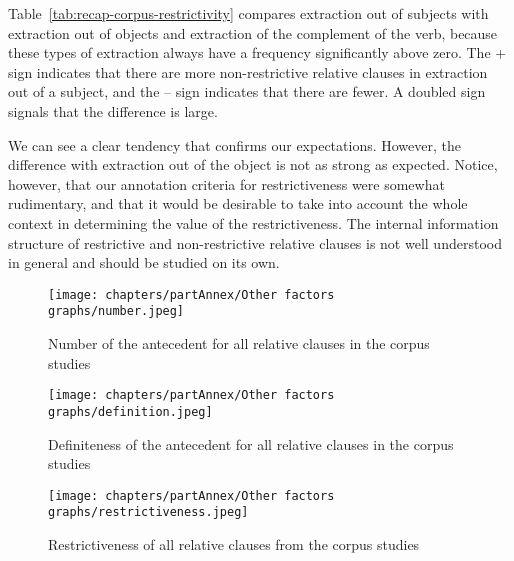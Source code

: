 Table~\ref{tab:recap-corpus-restrictivity} compares extraction out of subjects with extraction out of objects and extraction of the complement of the verb, because these types of extraction always have a frequency significantly above zero. The + sign indicates that there are more non-restrictive relative clauses in extraction out of a subject, and the -- sign indicates that there are fewer. A doubled sign signals that the difference is large. 

We can see a clear tendency that confirms our expectations. However, the difference with extraction out of the object is not as strong as expected. Notice, however, that our annotation criteria for restrictiveness were somewhat rudimentary, and that it would be desirable to take into account the whole context in determining the value of the restrictiveness. The internal information structure of restrictive and non-restrictive relative clauses is not well understood in general and should be studied on its own.

\begin{figure}
        \centering
        \texttt{[image: chapters/partAnnex/Other factors graphs/number.jpeg]}
        \caption{Number of the antecedent for all relative clauses in the corpus studies}
        \label{fig:number-corpus}
\end{figure}

\begin{figure}
        \centering
        \texttt{[image: chapters/partAnnex/Other factors graphs/definition.jpeg]}
        \caption{Definiteness of the antecedent for all relative clauses in the corpus studies}
        \label{fig:definiteness-corpus}
\end{figure}

\begin{figure}
        \centering
        \texttt{[image: chapters/partAnnex/Other factors graphs/restrictiveness.jpeg]}
        \caption{Restrictiveness of all relative clauses from the corpus studies}
        \label{fig:restrictiveness corpus}
\end{figure}

